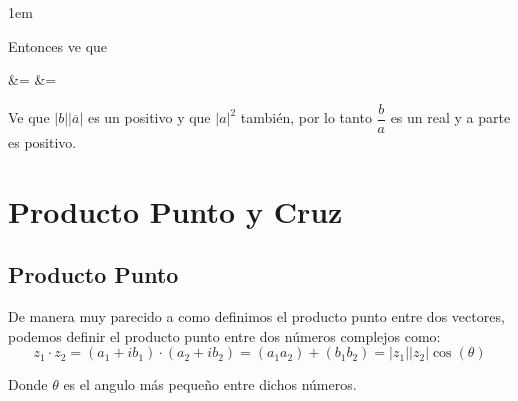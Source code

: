 \documentclass[12pt, fleqn]{report}                             %
\newcommand \Over {\overline}                                   %
\newenvironment{SmallIndentation}[1][0.75em]                    %
    {\begin{adjustwidth}{#1}{}\begin{footnotesize}}                 %
    {\end{footnotesize}\end{adjustwidth}}                           %
\newcommand{\Wrap}[1]{\left( #1 \right)}                        %
\newenvironment{MultiLineEquation*}[1]                          %
        {\begin{equation*}\begin{alignedat}{#1}}                    %
        {\end{alignedat}\end{equation*}}                            %
\newcommand{\Cos}[1]{\cos\Wrap{#1}}                             %
\begin{document}
\begin{itemize}
\begin{SmallIndentation}[1em]
                        Entonces ve que
                        \begin{MultiLineEquation*}{3}
                                &= \dfrac{b \Over{a}}{a \Over{a}} 
                                &= \dfrac{|b||\Over{a}|}{|a|^2}     \\
                        \end{MultiLineEquation*}

                        Ve que $|b||\Over{a}|$ es un positivo y que $|a|^2$ también, por lo tanto
                        $\dfrac{b}{a}$ es un real y a parte es positivo.

                    \end{SmallIndentation}


            \end{itemize}





        \clearpage
        \section{Producto Punto y Cruz}



            \subsection{Producto Punto}

                De manera muy parecido a como definimos el producto punto entre dos
                vectores, podemos definir el producto punto entre dos números complejos
                como:
                \begin{equation}
                    z_1 \cdot z_2
                        = (a_1 + ib_1) \cdot (a_2 + ib_2)
                        = (a_1 a_2) + (b_1 b_2)
                        = |z_1||z_2| \Cos{\theta}
                \end{equation}

                Donde $\theta$ es el angulo más pequeño entre dichos números.
\end{document}
